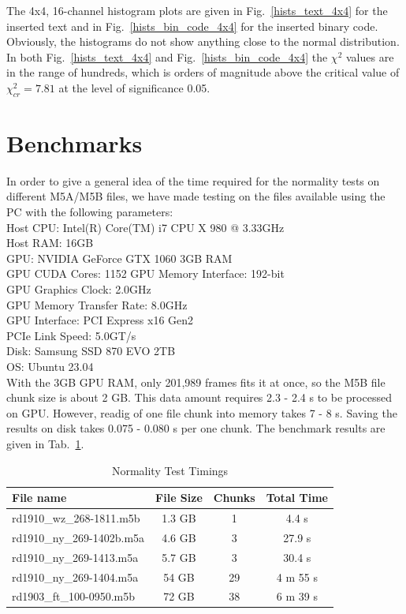 \documentclass[letterpaper,twoside,12pt]{article}
\begin{document}
The 4x4, 16-channel histogram plots are given in Fig.~\ref{hists_text_4x4} for the inserted text and in Fig.~\ref{hists_bin_code_4x4} for the inserted binary code. Obviously, the histograms do not show anything close to the normal distribution. In both Fig.~\ref{hists_text_4x4} and Fig.~\ref{hists_bin_code_4x4} the $\chi^2$ values are in the range of hundreds, which is orders of magnitude above the critical value of $\chi^2_{cr} = 7.81$ at the level of significance 0.05. 



\section{Benchmarks}

In order to give a general idea of the time required for the normality tests on different M5A/M5B files, we have made testing on the files available using the PC with the following parameters: \\

\indent Host CPU: Intel(R) Core(TM) i7 CPU X 980 @ 3.33GHz \\
\indent Host RAM: 16GB \\
\indent GPU: NVIDIA GeForce GTX 1060 3GB RAM \\
\indent GPU CUDA Cores: 1152
\indent GPU Memory Interface: 192-bit \\
\indent GPU Graphics Clock: 2.0GHz \\
\indent GPU Memory Transfer Rate: 8.0GHz \\
\indent GPU Interface: PCI Express x16 Gen2 \\
\indent PCIe Link Speed: 5.0GT/s \\
\indent Disk: Samsung SSD 870 EVO 2TB \\
\indent OS: Ubuntu 23.04 \\

With the 3GB GPU RAM, only 201,989 frames fits it at once, so the M5B file chunk size is about 2 GB. This data amount requires 2.3 - 2.4 s to be processed on GPU. However, readig of one file chunk into memory takes 7 - 8 s. Saving the results on disk takes 0.075 - 0.080 s per one chunk. The benchmark results are given in Tab.~\ref{timings}.

\begin{table}[ht!]
  \begin{center}
    \caption{Normality Test Timings}
    \label{timings}
    \begin{tabular}{l|c|c|c}
      \textbf{File name} & \textbf{File Size} & \textbf{Chunks} & \textbf{Total Time} \\
      \hline
      rd1910\_wz\_268-1811.m5b & 1.3 GB & 1 &  4.4 s \\
      rd1910\_ny\_269-1402b.m5a & 4.6 GB & 3 & 27.9 s \\
      rd1910\_ny\_269-1413.m5a & 5.7 GB & 3 & 30.4 s \\
      rd1910\_ny\_269-1404.m5a & 54 GB & 29 & 4 m 55 s \\
      rd1903\_ft\_100-0950.m5b & 72 GB & 38 & 6 m 39 s\\
    \end{tabular}
  \end{center}
\end{table}
\end{document}
